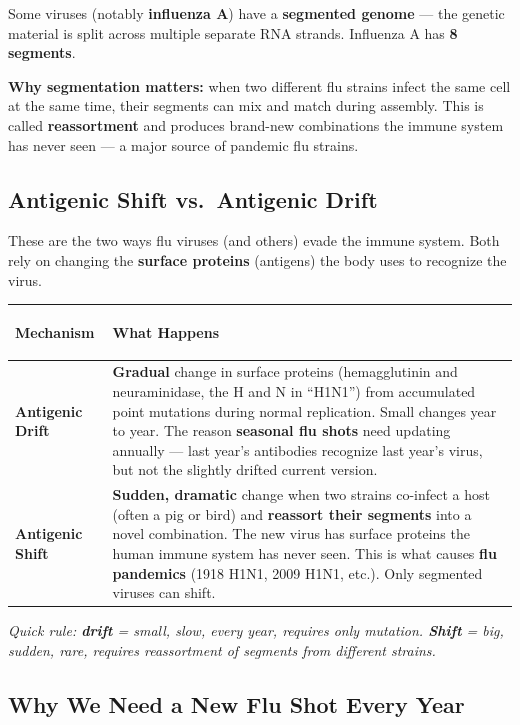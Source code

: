 \documentclass[11pt, letterpaper]{article}
\begin{document}
Some viruses (notably \textbf{influenza A}) have a \textbf{segmented genome} --- the genetic
material is split across multiple separate RNA strands. Influenza A has \textbf{8 segments}.

\textbf{Why segmentation matters:} when two different flu strains infect the same cell at
the same time, their segments can mix and match during assembly. This is called
\textbf{reassortment} and produces brand-new combinations the immune system has never
seen --- a major source of pandemic flu strains.

\subsection*{Antigenic Shift vs.\ Antigenic Drift}

These are the two ways flu viruses (and others) evade the immune system. Both rely on
changing the \textbf{surface proteins} (antigens) the body uses to recognize the virus.

\noindent
{\renewcommand{\arraystretch}{1.6}
\begin{tabularx}{\textwidth}{>{\bfseries\raggedright\arraybackslash}p{3.5cm}
                              >{\raggedright\arraybackslash}X}
\toprule
\rowcolor{tableheaderorange}
\textbf{Mechanism} & \textbf{What Happens} \\
\midrule
\rowcolor{rowOr} \textbf{Antigenic Drift} & \textbf{Gradual} change in surface proteins (hemagglutinin and neuraminidase, the H and N in ``H1N1'') from accumulated point mutations during normal replication. Small changes year to year. The reason \textbf{seasonal flu shots} need updating annually --- last year's antibodies recognize last year's virus, but not the slightly drifted current version. \\
\rowcolor{rowA}  \textbf{Antigenic Shift} & \textbf{Sudden, dramatic} change when two strains co-infect a host (often a pig or bird) and \textbf{reassort their segments} into a novel combination. The new virus has surface proteins the human immune system has never seen. This is what causes \textbf{flu pandemics} (1918 H1N1, 2009 H1N1, etc.). Only segmented viruses can shift. \\
\bottomrule
\end{tabularx}}

\textit{Quick rule: \textbf{drift} = small, slow, every year, requires only mutation. \textbf{Shift} = big, sudden, rare, requires reassortment of segments from different strains.}

\subsection*{Why We Need a New Flu Shot Every Year}
\end{document}
